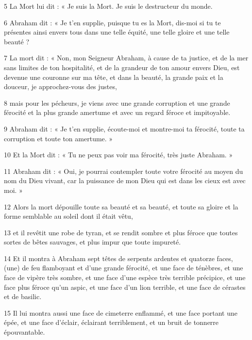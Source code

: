 \par 5 La Mort lui dit : « Je suis la Mort. Je suis le destructeur du monde.

\par 6 Abraham dit : « Je t'en supplie, puisque tu es la Mort, dis-moi si tu te présentes ainsi envers tous dans une telle équité, une telle gloire et une telle beauté ?

\par 7 La mort dit : « Non, mon Seigneur Abraham, à cause de ta justice, et de la mer sans limites de ton hospitalité, et de la grandeur de ton amour envers Dieu, est devenue une couronne sur ma tête, et dans la beauté, la grande paix et la douceur, je approchez-vous des justes,

\par 8 mais pour les pécheurs, je viens avec une grande corruption et une grande férocité et la plus grande amertume et avec un regard féroce et impitoyable.

\par 9 Abraham dit : « Je t’en supplie, écoute-moi et montre-moi ta férocité, toute ta corruption et toute ton amertume. »

\par 10 Et la Mort dit : « Tu ne peux pas voir ma férocité, très juste Abraham. »

\par 11 Abraham dit : « Oui, je pourrai contempler toute votre férocité au moyen du nom du Dieu vivant, car la puissance de mon Dieu qui est dans les cieux est avec moi. »

\par 12 Alors la mort dépouille toute sa beauté et sa beauté, et toute sa gloire et la forme semblable au soleil dont il était vêtu,

\par 13 et il revêtit une robe de tyran, et se rendit sombre et plus féroce que toutes sortes de bêtes sauvages, et plus impur que toute impureté.

\par 14 Et il montra à Abraham sept têtes de serpents ardentes et quatorze faces, (une) de feu flamboyant et d'une grande férocité, et une face de ténèbres, et une face de vipère très sombre, et une face d'une espèce très terrible précipice, et une face plus féroce qu'un aspic, et une face d'un lion terrible, et une face de cérastes et de basilic.

\par 15 Il lui montra aussi une face de cimeterre enflammé, et une face portant une épée, et une face d'éclair, éclairant terriblement, et un bruit de tonnerre épouvantable.

